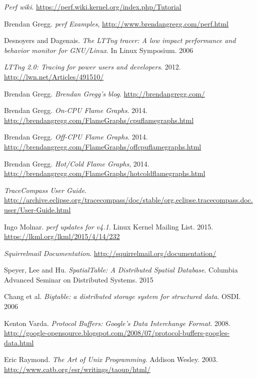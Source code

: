 \documentclass[10pt]{article}
\begin{document}
\raggedright
\begin{thebibliography}{9}
  \emph{Perf wiki}.
  \url{https://perf.wiki.kernel.org/index.php/Tutorial}

  Brendan Gregg.
  \emph{perf Examples},
  \url{http://www.brendangregg.com/perf.html}

  Desnoyers and Dagenais.
  \emph{The LTTng tracer: A low impact performance and behavior monitor for
  GNU/Linux}.
   In Linux Symposium.
   2006

  \emph{LTTng 2.0: Tracing for power users and developers}.
  2012.
  \url{http://lwn.net/Articles/491510/}

  Brendan Gregg.
  \emph{Brendan Gregg's blog}.
  \url{http://brendangregg.com/}

  Brendan Gregg.
  \emph{On-CPU Flame Graphs}.
   2014.
   \url{http://brendangregg.com/FlameGraphs/cpuflamegraphs.html}

  Brendan Gregg.
  \emph{Off-CPU Flame Graphs}.
   2014.
   \url{http://brendangregg.com/FlameGraphs/offcpuflamegraphs.html}

  Brendan Gregg.
  \emph{Hot/Cold Flame Graphs},
   2014.
   \url{http://brendangregg.com/FlameGraphs/hotcoldflamegraphs.html}

  \emph{TraceCompass User Guide}.
  \url{http://archive.eclipse.org/tracecompass/doc/stable/org.eclipse.tracecompass.doc.user/User-Guide.html}

  Ingo Molnar.
  \emph{perf updates for v4.1}.
  Linux Kernel Mailing List.
  2015.
  \url{https://lkml.org/lkml/2015/4/14/232}

  \emph{Squirrelmail Documentation}.
  \url{http://squirrelmail.org/documentation/}

  Speyer, Lee and Hu.
  \emph{SpatialTable: A Distributed Spatial Database}.
  Columbia Advanced Seminar on Distributed Systems.
  2015

  Chang et al.
  \emph{Bigtable: a distributed storage system for structured data}.
  OSDI.
  2006

  Kenton Varda.
  \emph{Protocol Buffers: Google's Data Interchange Format}.
  2008.
  \url{http://google-opensource.blogspot.com/2008/07/protocol-buffers-googles-data.html}

  Eric Raymond.
  \emph{The Art of Unix Programming}.
  Addison Wesley.
  2003.
  \url{http://www.catb.org/esr/writings/taoup/html/}

\end{thebibliography}
\end{document}
